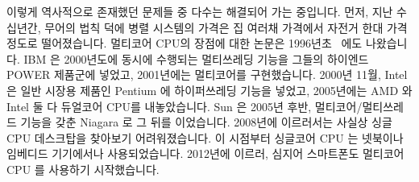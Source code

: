 
이렇게 역사적으로 존재했던 문제들 중 다수는 해결되어 가는 중입니다.
먼저, 지난 수십년간, 무어의 법칙 덕에 병렬 시스템의 가격은 집 여러채 가격에서
자전거 한대 가격 정도로 떨어졌습니다.
멀티코어 CPU의 장점에 대한 논문은 1996년초~\cite{Olukotun96} 에도 나왔습니다.
IBM 은 2000년도에 동시에 수행되는 멀티쓰레딩 기능을 그들의 하이엔드 POWER
제품군에 넣었고, 2001년에는 멀티코어를 구현했습니다.
2000년 11월, Intel 은 일반 시장용 제품인 Pentium 에 하이퍼쓰레딩 기능을 넣었고,
2005년에는 AMD 와 Intel 둘 다 듀얼코어 CPU를 내놓았습니다.
Sun 은 2005년 후반, 멀티코어/멀티쓰레드 기능을 갖춘 Niagara 로 그 뒤를
이었습니다.
2008년에 이르러서는 사실상 싱글 CPU 데스크탑을 찾아보기 어려워졌습니다.
이 시점부터 싱글코어 CPU 는 넷북이나 임베디드 기기에서나 사용되었습니다.
2012년에 이르러, 심지어 스마트폰도 멀티코어 CPU 를 사용하기 시작했습니다.


